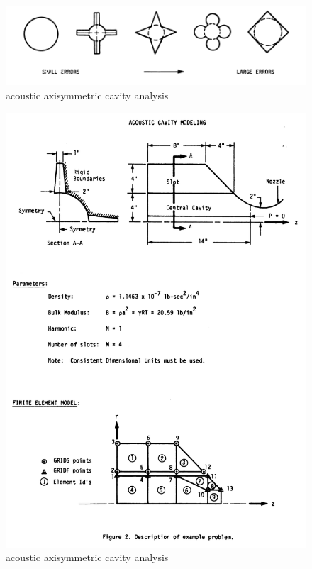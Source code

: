 \documentclass{article}
\begin{document}
\begin{figure}[h]
    \centering
\includegraphics[scale=0.35]{nastran_fig6}
    \caption{acoustic axisymmetric cavity analysis}
\end{figure}

\begin{figure}[h]
    \centering
\includegraphics[scale=0.35]{nastran_fig7}
    \caption{acoustic axisymmetric cavity analysis}
\end{figure}
\end{document}

